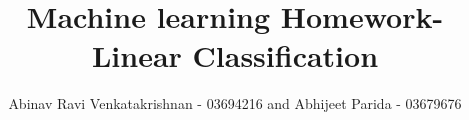 \documentclass[5pt,a4paper]{article}
\begin{document}
	\title{Machine learning Homework- Linear Classification}
	\author{Abinav Ravi Venkatakrishnan - 03694216 and Abhijeet Parida - 03679676}
	\maketitle
	
	
\end{document}
